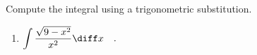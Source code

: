 Compute the integral using a trigonometric substitution.
\begin{enumerate}[ref={\fcProblemRef}]
\item \label{problemint(sqrt(9-x^2)/(x^2)dx)}
$ \displaystyle
\int \frac{\sqrt{9-x^2}}{x^2} \diff x\quad .
$
\end{enumerate}
